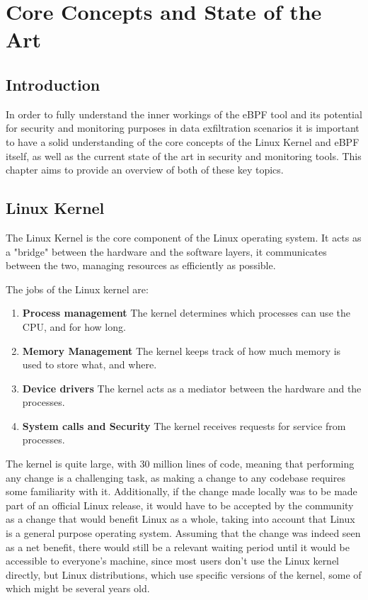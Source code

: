 \chapter{Core Concepts and State of the Art}

\section{Introduction}

In order to fully understand the inner workings of the eBPF tool and its potential for security and monitoring purposes in data exfiltration scenarios it is important to have a solid understanding of the core concepts of the Linux Kernel and eBPF itself, as well as the current state of the art in security and monitoring tools.
This chapter aims to provide an overview of both of these key topics.



\section{Linux Kernel}
The Linux Kernel is the core component of the Linux operating system. It acts as a "bridge" between the hardware and the software layers, it communicates between the two, managing resources as efficiently as possible. 

The jobs of the Linux kernel are:
\begin{enumerate}
    \item \textbf{Process management}
        The kernel determines which processes can use the CPU, and for how long.
    \item \textbf{Memory Management}
        The kernel keeps track of how much memory is used to store what, and where.
    \item \textbf{Device drivers}
        The kernel acts as a mediator between the hardware and the processes.
    \item \textbf{System calls and Security}
        The kernel receives requests for service from processes.
\end{enumerate}


The kernel is quite large, with 30 million lines of code, meaning that performing any change is a challenging task, as making a change to any codebase requires some familiarity with it. Additionally, if the change made locally was to be made part of an official Linux release, it would have to be accepted by the community as a change that would benefit Linux as a whole, taking into account that Linux is a general purpose operating system. Assuming that the change was indeed seen as a net benefit, there would still be a relevant waiting period until it would be accessible to everyone's machine, since most users don't use the Linux kernel directly, but Linux distributions, which use specific versions of the kernel, some of which might be several years old. 

